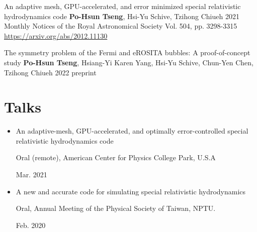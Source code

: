 \documentclass[%
               doublesided,
               paper=a4,
               fontsize=10pt
              ]{resume}
\begin{document}
\publication
	{An adaptive mesh, GPU-accelerated,
         and error minimized special relativistic hydrodynamics code} %
	{\textbf{Po-Hsun Tseng}, Hsi-Yu Schive, Tzihong Chiueh} %
	{2021} %
	{Monthly Notices of the Royal Astronomical Society Vol. 504, pp. 3298-3315\\ %
        \url{https://arxiv.org/abs/2012.11130}} %
       {
        } %

\publication
	{The symmetry problem of the Fermi and eROSITA bubbles: A proof-of-concept study}
	{\textbf{Po-Hsun Tseng}, Hsiang-Yi Karen Yang, Hsi-Yu Schive,
         Chun-Yen Chen, Tzihong Chiueh} %
	{2022} %
	{preprint}\\ %




\section{Talks}
\begin{itemize}
\item
          An adaptive-mesh, GPU-accelerated, and optimally error-controlled
          special relativistic hydrodynamics code\\
          \begin{minipage}{6in}
       	  Oral (remote), American Center for Physics College Park, U.S.A
          \end{minipage}
          \hfill
          \begin{minipage}{1in}
          Mar. 2021
          \end{minipage}
\item
          A new and accurate code for simulating special relativistic hydrodynamics\\
          \begin{minipage}{6in}
          Oral, Annual Meeting of the Physical Society of Taiwan, NPTU.
          \end{minipage}
          \hfill
          \begin{minipage}{1in}
          Feb. 2020
          \end{minipage}
\end{itemize}
\end{document}
